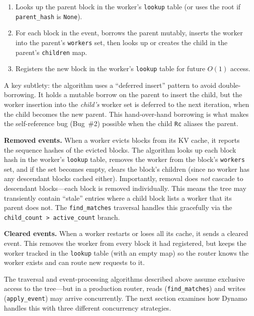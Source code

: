 \begin{enumerate}
  \item Looks up the parent block in the worker's \texttt{lookup} table (or uses the root if \texttt{parent\_hash} is \texttt{None}).
  \item For each block in the event, borrows the parent mutably, inserts the worker into the parent's \texttt{workers} set, then looks up or creates the child in the parent's \texttt{children} map.
  \item Registers the new block in the worker's \texttt{lookup} table for future $O(1)$ access.
\end{enumerate}

A key subtlety: the algorithm uses a ``deferred insert'' pattern to avoid double-borrowing. It holds a mutable borrow on the parent to insert the child, but the worker insertion into the \emph{child's} worker set is deferred to the next iteration, when the child becomes the new parent. This hand-over-hand borrowing is what makes the self-reference bug (Bug~\#2) possible when the child \texttt{Rc} aliases the parent.

\textbf{Removed events.} When a worker evicts blocks from its KV cache, it reports the sequence hashes of the evicted blocks. The algorithm looks up each block hash in the worker's \texttt{lookup} table, removes the worker from the block's \texttt{workers} set, and if the set becomes empty, clears the block's children (since no worker has any descendant blocks cached either). Importantly, removal does \emph{not} cascade to descendant blocks---each block is removed individually. This means the tree may transiently contain ``stale'' entries where a child block lists a worker that its parent does not. The \texttt{find\_matches} traversal handles this gracefully via the \texttt{child\_count > active\_count} branch.

\textbf{Cleared events.} When a worker restarts or loses all its cache, it sends a cleared event. This removes the worker from every block it had registered, but keeps the worker tracked in the \texttt{lookup} table (with an empty map) so the router knows the worker exists and can route new requests to it.

The traversal and event-processing algorithms described above assume exclusive access to the tree---but in a production router, reads (\texttt{find\_matches}) and writes (\texttt{apply\_event}) may arrive concurrently. The next section examines how Dynamo handles this with three different concurrency strategies.

